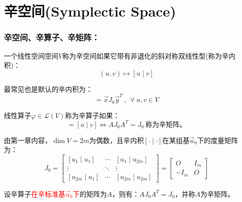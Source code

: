 \documentclass[zihao=5,UTF8]{report}
\theoremstyle{mystyle} %
\begin{document}
\section{辛空间(Symplectic Space)}
\subsubsection{辛空间、辛算子、辛矩阵：}
一个线性空间空间$V$称为辛空间如果它带有非退化的斜对称双线性型(称为辛内积)：
\begin{equation*}
    (u,v) \longmapsto [u\mid v]
\end{equation*}\par
{\par\color{gray}\small
最常见也是默认的辛内积为：
\begin{equation*}
    [u\mid v] = \vec{x}J_0\vec{y}^T\ ,\ \ \forall\ u,v \in V
\end{equation*}\par
\par}


线性算子$\varphi \in \mathscr{L}(V)$称为辛算子如果：
\begin{equation*}
    [\varphi(u)\mid \varphi(v)] = [u\mid v] \Longleftrightarrow AJ_0A^T = J_0\ \text{称为辛矩阵。}
\end{equation*}\par
{\color{gray}\small
由第一章内容，$\dim V = 2m$为偶数，且辛内积$[\cdot \mid \cdot]$在某组基$\vec{u}_0$下的度量矩阵为：
\begin{equation*}
    J_0 = \begin{bmatrix}  
        [u_1\mid u_1] & \cdots & [u_1\mid u_{2m}]  \\  
        \vdots & \ddots & \vdots \\  
        [u_{2m}\mid u_1] & \cdots &  [u_{2m}\mid u_{2m}] 
    \end{bmatrix} =
    \begin{bmatrix}
        O & I_m\\
        -I_m & O
    \end{bmatrix}
\end{equation*}
}\par   
设辛算子\textcolor{red}{在辛标准基$\vec{u}_0$下}的矩阵为$A$，则有：$AJ_0A^T = J_0$，并称$A$为辛矩阵。
\end{document}
